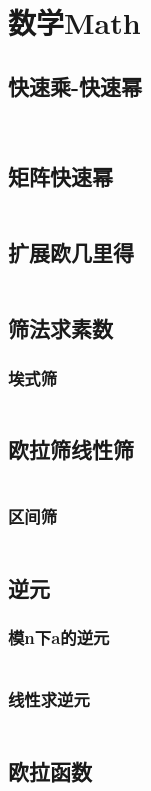 \documentclass[twoside,sub3section,UTF8]{ctexart}						%
\begin{document}
\newpage
\section{数学Math}
	\subsection{快速乘-快速幂}
		\inputminted{c++}{"Maths/fastmul.cpp"}
		\inputminted{c++}{"Maths/fastpow.cpp"}
	\subsection{矩阵快速幂}
		\inputminted{c++}{"Maths/MatrixFastpow.cpp"}	
	\subsection{扩展欧几里得}
		\inputminted{c++}{"Maths/exgcd.cpp"}
	\subsection{筛法求素数}
		\subsubsection{埃式筛}
			\inputminted{c++}{"Maths/Prime/EratosthenesSieve.cpp"}
		\subsection{欧拉筛线性筛}
			\inputminted{c++}{"Maths/Prime/EularSieve.cpp"}
		\subsubsection{区间筛}
			\inputminted{c++}{"Maths/Prime/SegmentSieve.cpp"}
	\subsection{逆元}
		\subsubsection{模n下a的逆元}
			\inputminted{c++}{"Maths/Rev/模n下a的逆元.cpp"}
		\subsubsection{线性求逆元}
			\inputminted{c++}{"Maths/Rev/线性求逆元.cpp"}
	\subsection{欧拉函数}
		\inputminted{c++}{"Maths/Elur.cpp"}
\end{document}

